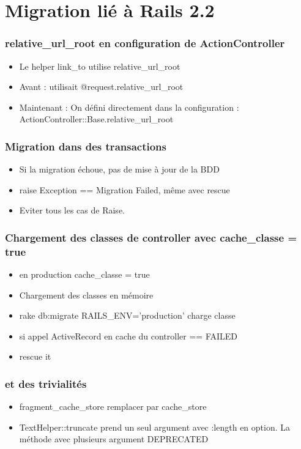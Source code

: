 \documentclass{beamer}
\begin{document}
\section{Migration lié à Rails 2.2}

\begin{frame}
  \frametitle{relative\_url\_root en configuration de ActionController}
  \begin{itemize}
    \item Le helper link\_to utilise relative\_url\_root
    \item Avant : utilisait @request.relative\_url\_root
    \item Maintenant : On défini directement dans la configuration :
    ActionController::Base.relative\_url\_root
  \end{itemize}
\end{frame}

\begin{frame}
    \frametitle{Migration dans des transactions}
    \begin{itemize}
        \item Si la migration échoue, pas de mise à jour de la BDD
        \item raise Exception == Migration Failed, même avec rescue
        \item Eviter tous les cas de Raise.
    \end{itemize}
\end{frame}

\begin{frame}
    \frametitle{Chargement des classes de controller avec cache\_classe = true}
    \begin{itemize}
        \item en production cache\_classe = true
        \item Chargement des classes en mémoire
        \item rake db:migrate RAILS\_ENV='production' charge classe 
        \item si appel ActiveRecord en cache du controller == FAILED
        \item rescue it
    \end{itemize}
\end{frame}

\begin{frame}
  \frametitle{et des trivialités}
  \begin{itemize}
    \item fragment\_cache\_store remplacer par cache\_store
    \item TextHelper::truncate prend un seul argument avec :length en option.
    La méthode avec plusieurs argument DEPRECATED
  \end{itemize}
\end{frame}
\end{document}
